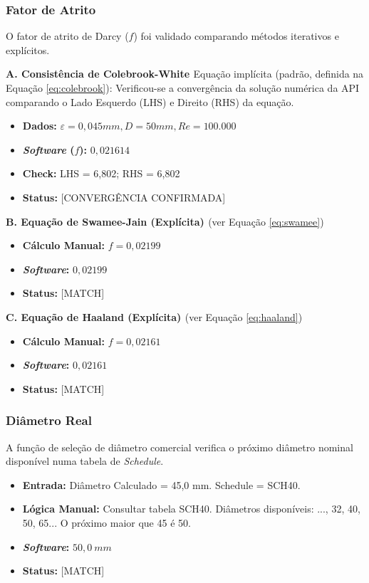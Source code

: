 \subsubsection{Fator de Atrito}
O fator de atrito de Darcy ($f$) foi validado comparando métodos iterativos e explícitos.

\textbf{A. Consistência de Colebrook-White \cite{colebrook1939}}
Equação implícita (padrão, definida na Equação \ref{eq:colebrook}):
Verificou-se a convergência da solução numérica da API comparando o Lado Esquerdo (LHS) e Direito (RHS) da equação.
\begin{itemize}
    \item \textbf{Dados:} $\varepsilon=0,045mm, D=50mm, Re=100.000$
    \item \textbf{\textit{Software} ($f$):} $0,021614$
    \item \textbf{Check:} LHS = 6,802; RHS = 6,802
    \item \textbf{Status:} [CONVERGÊNCIA CONFIRMADA]
\end{itemize}

\textbf{B. Equação de Swamee-Jain (Explícita) \cite{swamee1976}}
(ver Equação \ref{eq:swamee})
\begin{itemize}
    \item \textbf{Cálculo Manual:} $f = 0,02199$
    \item \textbf{\textit{Software}:} $0,02199$
    \item \textbf{Status:} [MATCH]
\end{itemize}

\textbf{C. Equação de Haaland (Explícita) \cite{haaland1983}}
(ver Equação \ref{eq:haaland})
\begin{itemize}
    \item \textbf{Cálculo Manual:} $f = 0,02161$
    \item \textbf{\textit{Software}:} $0,02161$
    \item \textbf{Status:} [MATCH]
\end{itemize}

\subsubsection{Diâmetro Real}
A função de seleção de diâmetro comercial verifica o próximo diâmetro nominal disponível numa tabela de \textit{Schedule}.

\begin{itemize}
    \item \textbf{Entrada:} Diâmetro Calculado = 45,0 mm. Schedule = SCH40.
    \item \textbf{Lógica Manual:} Consultar tabela SCH40. Diâmetros disponíveis: ..., 32, 40, 50, 65... O próximo maior que 45 é 50.
    \item \textbf{\textit{Software}:} $50,0 \ mm$
    \item \textbf{Status:} [MATCH]
\end{itemize}


